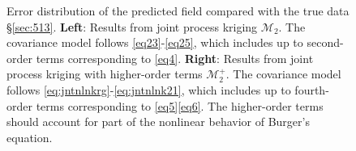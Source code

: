 \documentclass[article,ij4uq]{ij4uq}              %
\begin{document}
\begin{figure}[!t]
  \caption{Error distribution of the predicted field compared with the true data \S \ref{sec:513}. \textbf{Left}: Results from joint process kriging $\mathcal{M}_{2}$. The covariance model follows \eqref{eq23}-\eqref{eq25}, which includes up to second-order terms corresponding to \eqref{eq4}. \textbf{Right}: Results from joint process kriging with higher-order terms $\mathcal{M}_{2}^{+}$. The covariance model follows \eqref{eq:jntnlnkrg}-\eqref{eq:jntnlnk21}, which includes up to fourth-order terms corresponding to \eqref{eq5}\eqref{eq6}. The higher-order terms should account for part of the nonlinear behavior of Burger's equation.}\label{fig:2}
\end{figure}
\end{document}
